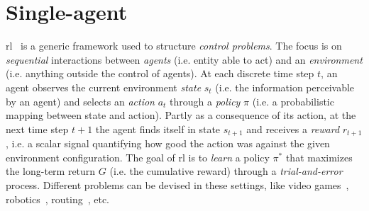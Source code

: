 \section{Single-agent}
\acl{rl}~\cite{sutton2018reinforcement-learning} is a generic framework 
 used to structure \emph{control problems}. 
%
The focus is on \emph{sequential} interactions between \emph{agents}
 (i.e. entity able to act) and an \emph{environment} 
 (i.e. anything outside the control of agents). 
%
At each discrete time step $t$, an agent observes the current environment \emph{state} $s_t$ 
 (i.e. the information perceivable by an agent) and selects an \emph{action} $a_t$ through a \emph{policy} $\pi$ (i.e. a probabilistic mapping between state and action). 
%
Partly as a consequence of its action, at the next time step $t+1$ the agent finds itself in state $s_{t+1}$ and receives a \emph{reward} $r_{t+1}$, 
 i.e. a scalar signal quantifying how good the action was against the given environment configuration. 
%
The goal of \ac{rl} is to \emph{learn} a policy \emph{$\pi^*$} that maximizes the long-term return $G$ (i.e. the cumulative reward) through a \emph{trial-and-error} process. 
%
Different problems can be devised in these settings, like video games~\cite{DBLP:journals/spm/ArulkumaranDBB17}, robotics~\cite{DBLP:journals/ijrr/KoberBP13}, routing~\cite{DBLP:journals/comsur/LuongHGNWLK19}, etc.

